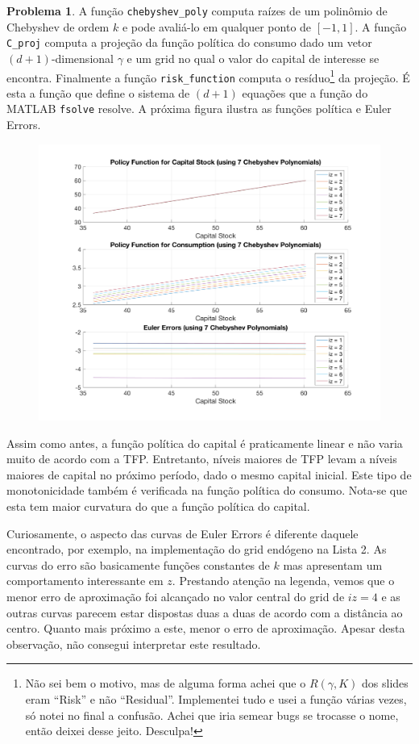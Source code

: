\documentclass[11pt]{article}
\theoremstyle{definition}
\newtheorem{prob}{Problema}
\theoremstyle{solution}
\begin{document}
\begin{prob}
	A função \texttt{chebyshev\_poly} computa raízes de um polinômio de Chebyshev de ordem $k$ e pode avaliá-lo em qualquer ponto de $[-1,1]$. A função \texttt{C\_proj} computa a projeção da função política do consumo dado um vetor $(d+1)$-dimensional $\gamma$ e um grid no qual o valor do capital de interesse se encontra. Finalmente a função \texttt{risk\_function} computa o resíduo\footnote{Não sei bem o motivo, mas de alguma forma achei que o $R(\gamma, K)$ dos slides eram ``Risk'' e não ``Residual''. Implementei tudo e usei a função várias vezes, só notei no final a confusão. Achei que iria semear bugs se trocasse o nome, então deixei desse jeito. Desculpa!} da projeção. É esta a função que define o sistema de $(d+1)$ equações que a função do MATLAB \texttt{fsolve} resolve. A próxima figura ilustra as funções política e Euler Errors.
	\begin{figure}[ht!]
		\centering
		\includegraphics[scale=0.25]{item1.png}
	\end{figure}
	
	Assim como antes, a função política do capital é praticamente linear e não varia muito de acordo com a TFP. Entretanto, níveis maiores de TFP levam a níveis maiores de capital no próximo período, dado o mesmo capital inicial. Este tipo de monotonicidade também é verificada na função política do consumo. Nota-se que esta tem maior curvatura do que a função política do capital.
	
	Curiosamente, o aspecto das curvas de Euler Errors é diferente daquele encontrado, por exemplo, na implementação do grid endógeno na Lista 2. As curvas do erro são basicamente funções constantes de $k$ mas apresentam um comportamento interessante em $z$. Prestando atenção na legenda, vemos que o menor erro de aproximação foi alcançado no valor central do grid de $iz = 4$ e as outras curvas parecem estar dispostas duas a duas de acordo com a distância ao centro. Quanto mais próximo a este, menor o erro de aproximação. Apesar desta observação, não consegui interpretar este resultado.
\end{prob}
\end{document}
